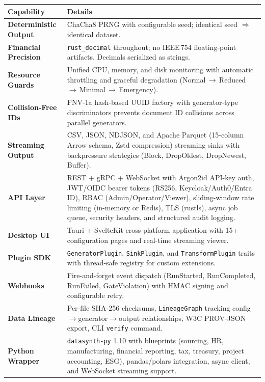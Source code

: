 \documentclass[11pt,a4paper]{article}
\begin{document}
\vspace{0.4em}
\noindent
\renewcommand{\arraystretch}{1.2}
\begin{tabularx}{\textwidth}{>{\bfseries\color{brand}}l X}
\toprule
\textbf{Capability} & \textbf{Details} \\
\midrule
Deterministic Output &
  ChaCha8 PRNG with configurable seed; identical seed $\Rightarrow$ identical
  dataset. \\
Financial Precision &
  \texttt{rust\_decimal} throughout; no IEEE\,754 floating-point artifacts.
  Decimals serialized as strings. \\
Resource Guards &
  Unified CPU, memory, and disk monitoring with automatic throttling and
  graceful degradation (Normal\,$\to$\,Reduced\,$\to$\,Minimal\,$\to$\,Emergency). \\
Collision-Free IDs &
  FNV-1a hash-based UUID factory with generator-type discriminators prevents
  document ID collisions across parallel generators. \\
Streaming Output &
  CSV, JSON, NDJSON, and Apache Parquet (15-column Arrow schema, Zstd
  compression) streaming sinks with backpressure strategies
  (Block, DropOldest, DropNewest, Buffer). \\
API Layer &
  REST + gRPC + WebSocket with Argon2id API-key auth, JWT/OIDC bearer tokens
  (RS256, Keycloak/Auth0/Entra ID), RBAC (Admin/Operator/Viewer),
  sliding-window rate limiting (in-memory or Redis), TLS (rustls),
  async job queue, security headers, and structured audit logging. \\
Desktop UI &
  Tauri + SvelteKit cross-platform application with 15+ configuration pages
  and real-time streaming viewer. \\
Plugin SDK &
  \texttt{GeneratorPlugin}, \texttt{SinkPlugin}, and \texttt{TransformPlugin}
  traits with thread-safe registry for custom extensions. \\
Webhooks &
  Fire-and-forget event dispatch (RunStarted, RunCompleted, RunFailed,
  GateViolation) with HMAC signing and configurable retry. \\
Data Lineage &
  Per-file SHA-256 checksums, \texttt{LineageGraph} tracking
  config$\to$generator$\to$output relationships, W3C PROV-JSON export,
  CLI \texttt{verify} command. \\
Python Wrapper &
  \texttt{datasynth-py} 1.10 with blueprints (sourcing, HR, manufacturing,
  financial reporting, tax, treasury, project accounting, ESG),
  pandas/polars integration, async client, and WebSocket streaming support. \\
\bottomrule
\end{tabularx}
\renewcommand{\arraystretch}{1.0}
\end{document}
